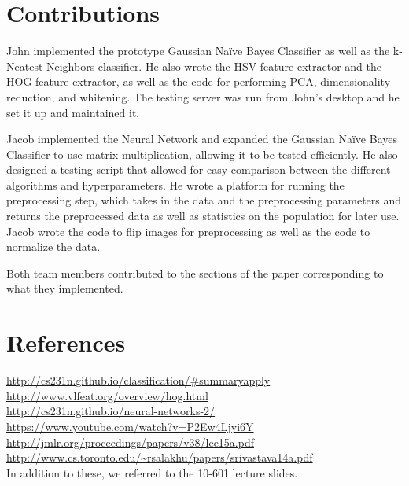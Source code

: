 \documentclass{article} %
\begin{document}
\section{Contributions}

John implemented the prototype Gaussian Na\"ive Bayes Classifier as well as the k-Neatest Neighbors classifier. He also wrote the HSV feature extractor and the HOG feature extractor, as well as the code for performing PCA, dimensionality reduction, and whitening. The testing server was run from John's desktop and he set it up and maintained it.

Jacob implemented the Neural Network and expanded the Gaussian Na\"ive Bayes Classifier to use matrix multiplication, allowing it to be tested efficiently. He also designed a testing script that allowed for easy comparison between the different algorithms and hyperparameters. He wrote a platform for running the preprocessing step, which takes in the data and the preprocessing parameters and returns the preprocessed data as well as statistics on the population for later use. Jacob wrote the code to flip images for preprocessing as well as the code to normalize the data.

Both team members contributed to the sections of the paper corresponding to what they implemented.

\section{References}


\url{http://cs231n.github.io/classification/#summaryapply}\\
\url{http://www.vlfeat.org/overview/hog.html}\\
\url{http://cs231n.github.io/neural-networks-2/}\\
\url{https://www.youtube.com/watch?v=P2Ew4Ljyi6Y}\\
\url{http://jmlr.org/proceedings/papers/v38/lee15a.pdf}\\
\url{http://www.cs.toronto.edu/~rsalakhu/papers/srivastava14a.pdf}\\
In addition to these, we referred to the 10-601 lecture slides.
\end{document}
